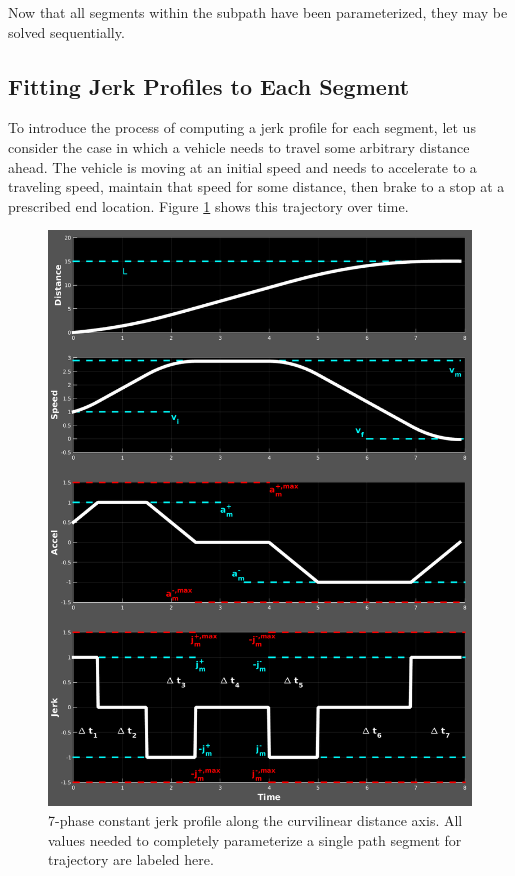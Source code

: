 \documentclass[letterpaper, 10 pt, conference]{ieeeconf}  %
\begin{document}
Now that all segments within the subpath have been parameterized, they may be solved sequentially.


\subsection{Fitting Jerk Profiles to Each Segment} \label{sec:jerkprofiles}

To introduce the process of computing a jerk profile for each segment, let us consider the case in which a vehicle needs to travel some arbitrary distance ahead.
The vehicle is moving at an initial speed and needs to accelerate to a traveling speed, maintain that speed for some distance, then brake to a stop at a prescribed end location.
Figure \ref{fig:full7phasespec} shows this trajectory over time.

\begin{figure}[tb]
  \centering
  \includegraphics[width=1.0\columnwidth]{graphics/Full7PhaseSpecVertical.png}
  \caption{
    7-phase constant jerk profile along the curvilinear distance axis.
    All values needed to completely parameterize a single path segment for trajectory are labeled here.}
  \label{fig:full7phasespec}
\end{figure}
\end{document}
